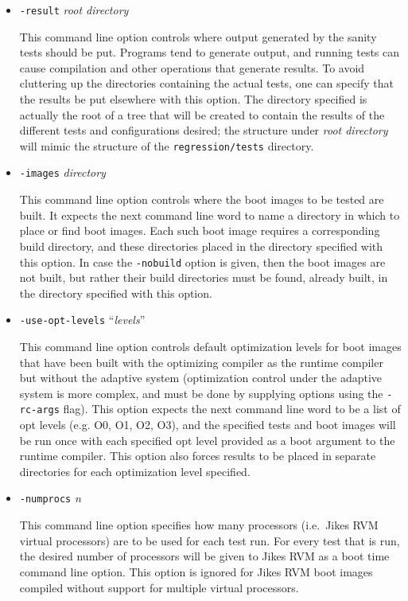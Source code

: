 \begin{itemize}
\item{\tt{-result}} {\em root directory}

 This command line option controls where output generated by the
sanity tests should be put.  Programs tend to generate output, and
running tests can cause compilation and other operations that generate
results.  To avoid cluttering up the directories containing the actual
tests, one can specify that the results be put elsewhere with this
option.  The directory specified is actually the root of a tree that
will be created to contain the results of the different tests and
configurations desired; the structure under {\em root
directory} will mimic the structure of the \texttt{regression/tests} directory. 

\item{\tt{-images}} {\em directory}

 This command line option controls where the boot images to be tested
are built. It expects the next command line word to name a directory
in which to place or find boot images. Each such boot image requires a
corresponding build directory, and these directories placed in the
directory specified with this option.  In case the {\tt -nobuild}
option is given, then the boot images are not built, but rather their
build directories must be found, already built, in the directory
specified with this option.

\item{\tt{-use-opt-levels}} ``{\em levels}''

 This command line option controls default optimization levels for
boot images that have been built with the optimizing compiler as the
runtime compiler but without the adaptive system (optimization control
under the adaptive system is more complex, and must be done by
supplying options using the {\tt -rc-args} flag).  This option expects
the next command line word to be a list of opt levels (e.g. O0, O1,
O2, O3), and the specified tests and boot images will be run once with
each specified opt level provided as a boot argument to the runtime
compiler.  This option also forces results to be placed in separate
directories for each optimization level specified.

\item{\tt{-numprocs}} {\em n}

 This command line option specifies how many processors (i.e.\ Jikes\TMweb{}
RVM virtual processors) are to be used for each test run.  For every
test that is run, the desired number of processors will be given to
Jikes RVM as a boot time command line option.  This option is ignored
for Jikes RVM boot images compiled without support for multiple
virtual processors.


\end{itemize}
